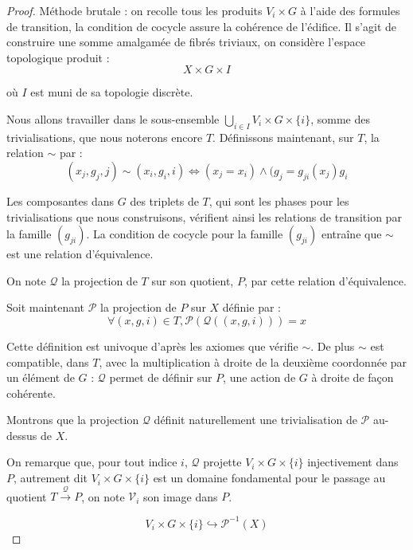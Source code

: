 \begin{proof}
Méthode brutale : on recolle tous les produits $V_i \times G$ à l'aide des formules de transition, la condition de cocycle assure la cohérence de l'édifice. %
Il s'agit de construire une somme amalgamée de fibrés triviaux, on considère l'espace topologique produit :
\[X \times G \times I\]

où $I$ est muni de sa topologie discrète.

\par
Nous allons travailler dans le sous-ensemble $\bigcup_{i \in I} V_i \times G \times \{i\}$, somme des trivialisations, que nous noterons encore $T$. %
Définissons maintenant, sur $T$, la relation $\sim$ par :
\[(x_j,g_j,j) \sim (x_i,g_i,i) \Leftrightarrow (x_j = x_i) \wedge (g_j = g_{ji}(x_j) g_i\]

Les composantes dans $G$ des triplets de $T$, qui sont les phases pour les trivialisations que nous construisons, %
vérifient ainsi les relations de transition par la famille $(g_{ji})$. %
La condition de cocycle pour la famille $(g_{ji})$ entraîne que $\sim$ est une relation d'équivalence.

\par
On note $\mathcal{Q}$ la projection de $T$ sur son quotient, $P$, par cette relation d'équivalence.

\par
Soit maintenant $\mathcal{P}$ la projection de $P$ sur $X$ définie par :
\[\forall (x,g,i) \in T , \mathcal{P}(\mathcal{Q}((x,g,i))) = x\]

Cette définition est univoque d'après les axiomes que vérifie $\sim$. %
De plus $\sim$ est compatible, dans $T$, avec la multiplication à droite de la deuxième coordonnée par un élément de $G$ : %
$\mathcal{Q}$ permet de définir sur $P$, une action de $G$ à droite de façon cohérente.

\par
Montrons que la projection $\mathcal{Q}$ définit naturellement une trivialisation de $\mathcal{P}$ au-dessus de $X$.

\par
On remarque que, pour tout indice $i$, $\mathcal{Q}$ projette $V_i \times G \times \{i\}$ injectivement dans $P$, %
autrement dit $V_i \times G \times \{i\}$ est un domaine fondamental pour le passage au quotient %
$T \xrightarrow{\mathcal{Q}} P$, on note $\mathcal{V}_i$ son image dans $P$.

\[V_i \times G \times \{i\} \hookrightarrow \mathcal{P}^{-1}(X)\]


\end{proof}
